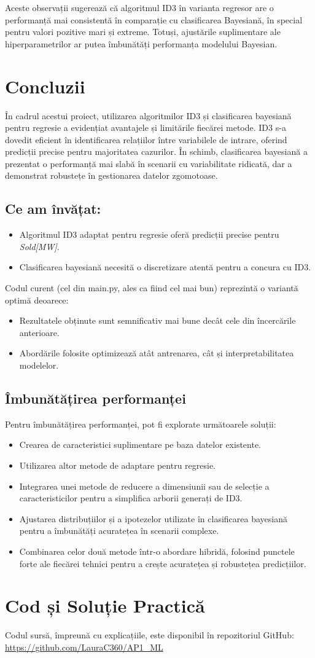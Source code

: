 \documentclass[a4paper,12pt]{article}
\begin{document}
Aceste observații sugerează că algoritmul ID3 în varianta regresor are o performanță mai consistentă în comparație cu clasificarea Bayesiană, în special pentru valori pozitive mari și extreme. Totuși, ajustările suplimentare ale hiperparametrilor ar putea îmbunătăți performanța modelului Bayesian.

\section{Concluzii}
În cadrul acestui proiect, utilizarea algoritmilor ID3 și clasificarea bayesiană pentru regresie a evidențiat avantajele și limitările fiecărei metode. ID3 s-a dovedit eficient în identificarea relațiilor între variabilele de intrare, oferind predicții precise pentru majoritatea cazurilor. În schimb, clasificarea bayesiană a prezentat o performanță mai slabă în scenarii cu variabilitate ridicată, dar a demonstrat robustețe în gestionarea datelor zgomotoase.

\subsection*{Ce am învățat:}
\begin{itemize}
    \item Algoritmul ID3 adaptat pentru regresie oferă predicții precise pentru \textit{Sold[MW]}.
    \item Clasificarea bayesiană necesită o discretizare atentă pentru a concura cu ID3.
\end{itemize}

Codul curent (cel din main.py, ales ca fiind cel mai bun) reprezintă o variantă optimă deoarece:
\begin{itemize}
    \item Rezultatele obținute sunt semnificativ mai bune decât cele din încercările anterioare.
    \item Abordările folosite optimizează atât antrenarea, cât și interpretabilitatea modelelor.
\end{itemize}

\subsection*{Îmbunătățirea performanței} 
    Pentru îmbunătățirea performanței, pot fi explorate următoarele soluții:
\begin{itemize}
    \item Crearea de caracteristici suplimentare pe baza datelor existente.
    \item Utilizarea altor metode de adaptare pentru regresie.
    \item Integrarea unei metode de reducere a dimensiunii sau de selecție a caracteristicilor pentru a simplifica arborii generați de ID3.
    \item Ajustarea distribuțiilor și a ipotezelor utilizate în clasificarea bayesiană pentru a îmbunătăți acuratețea în scenarii complexe.
    \item Combinarea celor două metode într-o abordare hibridă, folosind punctele forte ale fiecărei tehnici pentru a crește acuratețea și robustețea predicțiilor.
\end{itemize}

\section*{Cod și Soluție Practică}
Codul sursă, împreună cu explicațiile, este disponibil în repozitoriul GitHub: \url{https://github.com/LauraC360/AP1_ML}
\end{document}
